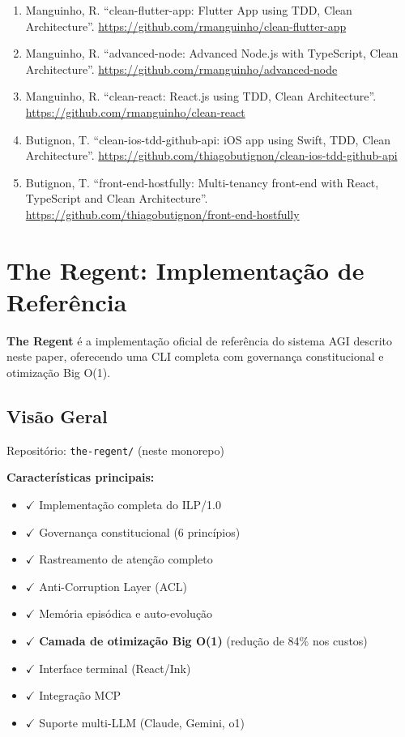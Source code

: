 \documentclass[11pt]{article}
\begin{document}
\begin{enumerate}
    \item Manguinho, R. ``clean-flutter-app: Flutter App using TDD, Clean Architecture''. \url{https://github.com/rmanguinho/clean-flutter-app}
    \item Manguinho, R. ``advanced-node: Advanced Node.js with TypeScript, Clean Architecture''. \url{https://github.com/rmanguinho/advanced-node}
    \item Manguinho, R. ``clean-react: React.js using TDD, Clean Architecture''. \url{https://github.com/rmanguinho/clean-react}
    \item Butignon, T. ``clean-ios-tdd-github-api: iOS app using Swift, TDD, Clean Architecture''. \url{https://github.com/thiagobutignon/clean-ios-tdd-github-api}
    \item Butignon, T. ``front-end-hostfully: Multi-tenancy front-end with React, TypeScript and Clean Architecture''. \url{https://github.com/thiagobutignon/front-end-hostfully}
\end{enumerate}

\appendix

\section{The Regent: Implementação de Referência}

\textbf{The Regent} é a implementação oficial de referência do sistema AGI descrito neste paper, oferecendo uma CLI completa com governança constitucional e otimização Big O(1).

\subsection{Visão Geral}

Repositório: \texttt{the-regent/} (neste monorepo)

\textbf{Características principais:}
\begin{itemize}
    \item $\checkmark$ Implementação completa do ILP/1.0
    \item $\checkmark$ Governança constitucional (6 princípios)
    \item $\checkmark$ Rastreamento de atenção completo
    \item $\checkmark$ Anti-Corruption Layer (ACL)
    \item $\checkmark$ Memória episódica e auto-evolução
    \item $\checkmark$ \textbf{Camada de otimização Big O(1)} (redução de 84\% nos custos)
    \item $\checkmark$ Interface terminal (React/Ink)
    \item $\checkmark$ Integração MCP
    \item $\checkmark$ Suporte multi-LLM (Claude, Gemini, o1)
\end{itemize}
\end{document}
